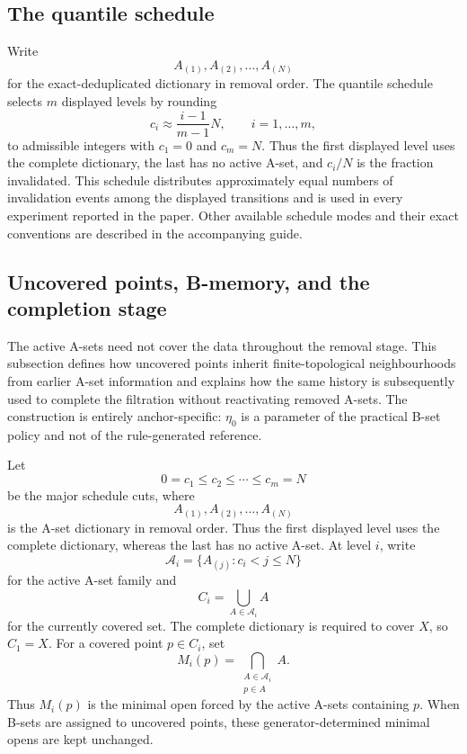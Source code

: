 \documentclass[a4paper,11pt]{article}
\theoremstyle{definition}
\theoremstyle{remark}
\begin{document}
\subsection{The quantile schedule}
\label{subsec:schedules}

Write
$$
A_{(1)},A_{(2)},\ldots,A_{(N)}
$$
for the exact-deduplicated dictionary in removal order. The quantile schedule selects $m$ displayed levels by rounding
$$
c_i\approx\frac{i-1}{m-1}N,\qquad i=1,\ldots,m,
$$
to admissible integers with $c_1=0$ and $c_m=N$. Thus the first displayed level uses the complete dictionary, the last has no active A-set, and $c_i/N$ is the fraction invalidated. This schedule distributes approximately equal numbers of invalidation events among the displayed transitions and is used in every experiment reported in the paper. Other available schedule modes and their exact conventions are described in the accompanying guide.

\subsection{Uncovered points, B-memory, and the completion stage}
\label{subsec:b-sets}

The active A-sets need not cover the data throughout the removal stage. This subsection defines how uncovered points inherit finite-topological neighbourhoods from earlier A-set information and explains how the same history is subsequently used to complete the filtration without reactivating removed A-sets. The construction is entirely anchor-specific: $\eta_0$ is a parameter of the practical B-set policy and not of the rule-generated reference.

Let
$$
0=c_1\leq c_2\leq\cdots\leq c_m=N
$$
be the major schedule cuts, where
$$
A_{(1)},A_{(2)},\ldots,A_{(N)}
$$
is the A-set dictionary in removal order. Thus the first displayed level uses the complete dictionary, whereas the last has no active A-set. At level $i$, write
$$
\mathcal A_i = \{A_{(j)}\colon c_i<j\leq N\}
$$
for the active A-set family and
$$
C_i = \bigcup_{A\in\mathcal A_i}A
$$
for the currently covered set. The complete dictionary is required to cover $X$, so $C_1=X$. For a covered point $p\in C_i$, set
$$
M_i(p) = \bigcap_{\substack{A\in\mathcal A_i\\p\in A}}A.
$$
Thus $M_i(p)$ is the minimal open forced by the active A-sets containing $p$. When B-sets are assigned to uncovered points, these generator-determined minimal opens are kept unchanged.
\end{document}
